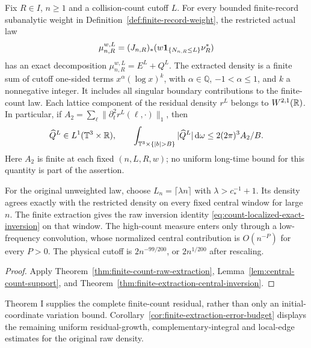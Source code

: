 \begin{maintheorem}
\label{thm:intro-finite-count-extraction}
Fix $R\in I$, $n\ge1$ and a collision-count cutoff $L$. For every
bounded finite-record subanalytic weight in
Definition~\ref{def:finite-record-weight}, the restricted actual law
\[
 \mu_{n,R}^{w,L}=(J_{n,R})_*
                    (w\mathbf1_{\{N_{n,R}\le L\}}\nu_R^*)
\]
has an exact decomposition $\mu_{n,R}^{w,L}=E^L+Q^L$.
The extracted density is a finite sum of cutoff one-sided terms
$x^\alpha(\log x)^k$, with $\alpha\in\mathbb Q$, $-1<\alpha\le1$,
and $k$ a nonnegative integer. It includes all singular boundary
contributions to the finite-count law. Each lattice component of the
residual density $r^L$ belongs to $W^{2,1}(\mathbb R)$. In particular, if
$A_2=\sum_\ell\|\partial_t^2 r^L(\ell,\cdot)\|_1$, then
\[
 \widehat Q^L\in L^1(\T^3\times\R),\qquad
 \int_{\T^3\times\{|b|>B\}}|\widehat Q^L|\dd\omega
                   \le 2(2\pi)^3 A_2/B .
\]
Here $A_2$ is finite at each fixed $(n,L,R,w)$; no uniform long-time
bound for this quantity is part of the assertion.

For the original unweighted law, choose $L_n=\lceil\lambda n\rceil$
with $\lambda>c_*^{-1}+1$. Its density agrees exactly with the restricted
density on every fixed central window for large $n$.
The finite extraction gives the raw inversion identity
\eqref{eq:count-localized-exact-inversion} on that window. The
high-count measure enters only through a low-frequency convolution,
whose normalized central contribution is $O(n^{-P})$ for every $P>0$.
The physical cutoff is $2n^{-99/200}$, or $2n^{1/200}$ after rescaling.
\end{maintheorem}
\begin{proof}
Apply Theorem~\ref{thm:finite-count-raw-extraction},
Lemma~\ref{lem:central-count-support}, and
Theorem~\ref{thm:finite-extraction-central-inversion}.
\end{proof}

Theorem I supplies the complete finite-count residual, rather than only
an initial-coordinate variation bound. Corollary~\ref{cor:finite-extraction-error-budget}
displays the remaining uniform residual-growth, complementary-integral
and local-edge estimates for the original raw density.


